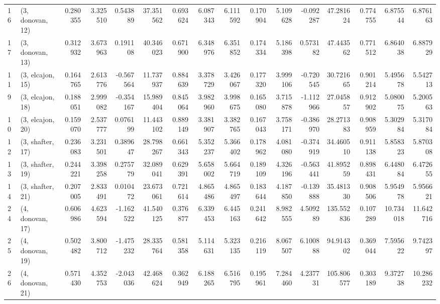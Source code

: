 \begin{tabular}{llrrrrrrrrrrrrrr}
16 &  (3, donovan, 12) &   0.280355 &  3.325510 &  0.543889 &  37.351562 &  0.693624 &   6.087343 &  6.111592 &  0.170904 &  5.109628 & -0.092287 &   47.281624 &  0.774755 &   6.875544 &   6.876163 \\
17 &  (3, donovan, 13) &   0.312932 &  3.673963 &  0.191108 &  40.346023 &  0.671900 &   6.348976 &  6.351852 &  0.174334 &  5.186398 &  0.573182 &   47.443562 &  0.771512 &   6.864038 &   6.887929 \\
11 &  (3, elcajon, 15) &   0.164765 &  2.613776 & -0.567564 &  11.737937 &  0.884639 &   3.378729 &  3.426067 &  0.177320 &  3.999106 & -0.720545 &   30.721665 &  0.901214 &   5.495678 &   5.542713 \\
9  &  (3, elcajon, 18) &   0.188051 &  2.999082 & -0.354167 &  15.989404 &  0.845064 &   3.982960 &  3.998675 &  0.165080 &  3.715878 & -1.112966 &   27.045857 &  0.912902 &   5.080075 &   5.200563 \\
10 &  (3, elcajon, 20) &   0.159070 &  2.537777 &  0.076199 &  11.443102 &  0.889149 &   3.381907 &  3.382765 &  0.167043 &  3.758171 & -0.386970 &   28.271383 &  0.908959 &   5.302984 &   5.317084 \\
12 &  (3, shafter, 17) &   0.236083 &  3.231501 &  0.389647 &  28.798267 &  0.661343 &   5.352237 &  5.366402 &  0.178962 &  4.081080 & -0.374919 &   34.460510 &  0.911138 &   5.858323 &   5.870308 \\
13 &  (3, shafter, 19) &   0.244221 &  3.398258 &  0.275779 &  32.089041 &  0.629391 &   5.658002 &  5.664719 &  0.189109 &  4.326196 & -0.563441 &   41.895259 &  0.898431 &   6.448084 &   6.472655 \\
14 &  (3, shafter, 21) &   0.207005 &  2.833491 &  0.010472 &  23.673061 &  0.721614 &   4.865486 &  4.865497 &  0.183644 &  4.187850 & -0.139888 &   35.481330 &  0.908506 &   5.954978 &   5.956621 \\
24 &  (4, donovan, 17) &   0.606986 &  4.623594 & -1.162522 &  41.540125 &  0.376877 &   6.339453 &  6.445163 &  0.241642 &  8.982555 &  4.509289 &  135.552836 &  0.107289 &  10.734018 &  11.642716 \\
25 &  (4, donovan, 19) &   0.502482 &  3.800712 & -1.475232 &  28.335764 &  0.581358 &   5.114631 &  5.323135 &  0.216119 &  8.067507 &  6.100888 &   94.914302 &  0.369044 &   7.595622 &   9.742397 \\
26 &  (4, donovan, 21) &   0.571430 &  4.352753 & -2.043036 &  42.468624 &  0.362949 &   6.188265 &  6.516795 &  0.195961 &  7.284460 &  4.237731 &  105.806577 &  0.303189 &   9.372738 &  10.286232 \\

\end{tabular}
